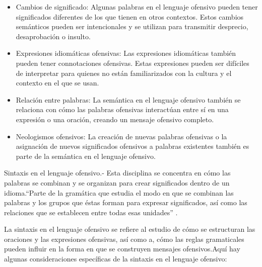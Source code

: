 \begin{itemize}
			\item Cambios de significado: Algunas palabras en el lenguaje ofensivo pueden tener significados diferentes de los que tienen en otros contextos. Estos cambios semánticos pueden ser intencionales y se utilizan para transmitir desprecio, desaprobación o insulto.
			
			\item	Expresiones idiomáticas ofensivas: Las expresiones idiomáticas también pueden tener connotaciones ofensivas. Estas expresiones pueden ser difíciles de interpretar para quienes no están familiarizados con la cultura y el contexto en el que se usan.
			
			\item Relación entre palabras: La semántica en el lenguaje ofensivo también se relaciona con cómo las palabras ofensivas interactúan entre sí en una expresión o una oración, creando un mensaje ofensivo completo.
			
			\item Neologismos ofensivos: La creación de nuevas palabras ofensivas o la asignación de nuevos significados ofensivos a palabras existentes también es parte de la semántica en el lenguaje ofensivo.
			
\end{itemize}

Sintaxis en el lenguaje ofensivo.-  Esta disciplina se concentra en cómo las palabras se combinan y se organizan para crear significados dentro de un idioma.``Parte de la gramática que estudia el modo en que se combinan las palabras y los grupos que éstas forman para expresar significados, así como las relaciones que se establecen entre todas esas unidades'' \cite[``Sintaxis'' definicion 1]{rae2023Online}.

La sintaxis en el lenguaje ofensivo se refiere al estudio de cómo se estructuran las oraciones y las expresiones ofensivas, así como a, cómo las reglas gramaticales pueden influir en la forma en que se construyen mensajes ofensivos.Aquí hay algunas consideraciones específicas de la sintaxis en el lenguaje ofensivo:
		
